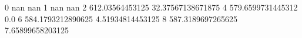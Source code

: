 0 nan nan
1 nan nan
2 612.03564453125 32.37567138671875
4 579.6599731445312 0.0
6 584.1793212890625 4.51934814453125
8 587.3189697265625 7.65899658203125
